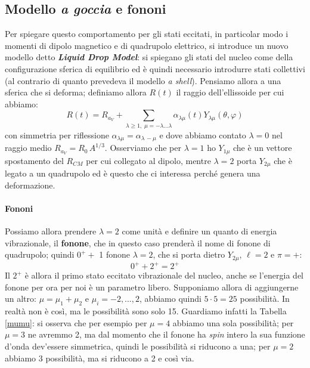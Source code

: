 \subsection{Modello \textit{a goccia} e fononi}
Per spiegare questo comportamento per gli stati eccitati, in particolar modo i momenti di dipolo magnetico e di quadrupolo elettrico, si introduce un nuovo modello detto \textbf{\textit{Liquid Drop Model}}: si spiegano gli stati del nucleo come  della configurazione sferica di equilibrio ed è quindi necessario introdurre stati collettivi (al contrario di quanto prevedeva il modello \textit{a shell}). Pensiamo allora a una  sferica che si deforma; definiamo allora $R(t)$ il raggio dell'ellissoide per cui abbiamo:
$$R(t) = R_{a_V} + \sum_{\lambda\geq 1,\; \mu=-\lambda \dots \lambda}\alpha_{\lambda \mu}(t) Y_{\lambda\mu}(\theta,\varphi)$$
con simmetria per riflessione $\alpha_{\lambda\mu} = \alpha_{\lambda\,-\mu}$ e dove abbiamo contato $\lambda=0$ nel raggio medio $R_{a_V}=R_0\,A^{1/3}$. Osserviamo che per $\lambda=1$ ho $Y_{1\mu}$ che è un vettore spostamento del $R_{CM}$ per cui collegato al dipolo, mentre $\lambda = 2$ porta $Y_{2\mu}$ che è legato a un quadrupolo ed è questo che ci interessa perché genera una deformazione. \paragraph{Fononi} Possiamo allora prendere $\lambda=2 $ come unità e definire un quanto di energia vibrazionale, il \textbf{fonone}, che  in questo caso prenderà il nome di fonone di quadrupolo; quindi $0^+ + $ 1 fonone $\lambda=2$, che si porta dietro $Y_{2\mu}$, $\ell =2$ e $\pi=+$:
$$0^+ + 2^+ = 2^+$$
Il $2^+$ è allora il primo stato eccitato vibrazionale del nucleo, anche se l'energia del fonone per ora per noi è un parametro libero. Supponiamo allora di aggiungerne un altro: $\mu = \mu_1 + \mu_2$ e $\mu_i = -2, \dots, 2$, abbiamo quindi $5\cdot 5 = 25$ possibilità. In realtà non è così, ma le possibilità sono solo 15. Guardiamo infatti la Tabella \ref{mumu}: si osserva che per esempio per $\mu=4$ abbiamo una sola possibilità; per $\mu=3$ ne avremmo 2, ma dal momento che il fonone ha \textit{spin} intero la sua funzione d'onda dev'essere simmetrica, quindi le possibilità si riducono a una; per $\mu = 2$ abbiamo 3 possibilità, ma si riducono a 2 e così via. 

